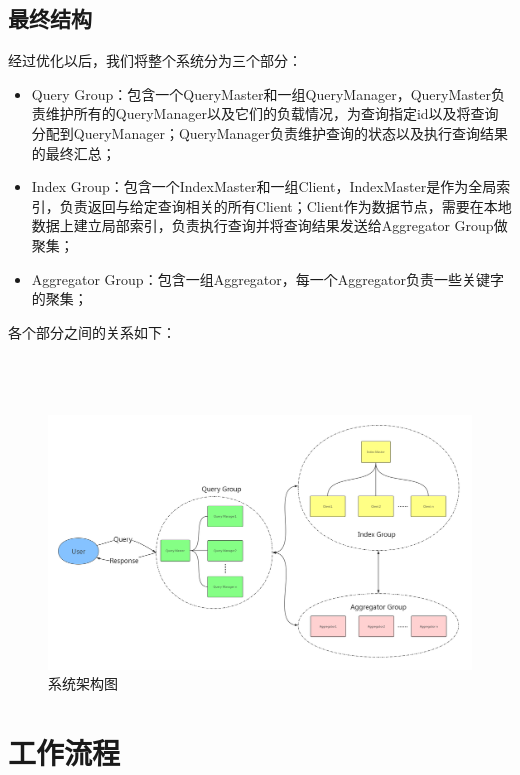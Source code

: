 \documentclass{elegantpaper}
\begin{document}
\subsection{最终结构}

经过优化以后，我们将整个系统分为三个部分：

\begin{itemize}

    \item Query Group：包含一个QueryMaster和一组QueryManager，QueryMaster负责维护所有的QueryManager以及它们的负载情况，为查询指定id以及将查询分配到QueryManager；QueryManager负责维护查询的状态以及执行查询结果的最终汇总；

    \item Index Group：包含一个IndexMaster和一组Client，IndexMaster是作为全局索引，负责返回与给定查询相关的所有Client；Client作为数据节点，需要在本地数据上建立局部索引，负责执行查询并将查询结果发送给Aggregator Group做聚集；
    
    \item Aggregator Group：包含一组Aggregator，每一个Aggregator负责一些关键字的聚集；
    
\end{itemize}

\noindent 各个部分之间的关系如下：\\\\\\\\

\begin{figure}[htbp]
    \centering
    \includegraphics[width=1\textwidth]{figure/architecture.png}
    \caption{系统架构图}
\end{figure}

\section{工作流程}
\end{document}
